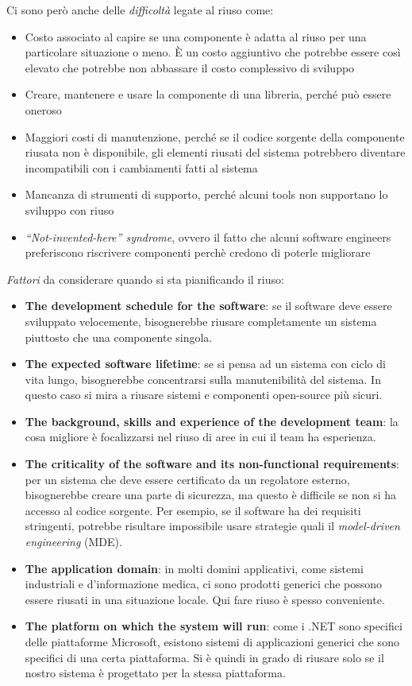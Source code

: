 			Ci sono però anche delle \textit{difficoltà} legate al riuso come:
			\begin{itemize}
				\item Costo associato al capire se una componente è adatta al riuso per una particolare situazione o meno. È un costo aggiuntivo che potrebbe essere così elevato che potrebbe non abbassare il costo complessivo di sviluppo
				\item Creare, mantenere e usare la componente di una libreria, perché può essere oneroso
				\item Maggiori costi di manutenzione, perché se il codice sorgente della componente riusata non è disponibile, gli elementi riusati del sistema potrebbero diventare incompatibili con i cambiamenti fatti al sistema
				\item Mancanza di strumenti di supporto, perché alcuni tools non supportano lo sviluppo con riuso
				\item \textit{``Not-invented-here'' syndrome}, ovvero il fatto che alcuni software engineers preferiscono riscrivere componenti perchè credono di poterle migliorare
			\end{itemize}
			\textit{Fattori} da considerare quando si sta pianificando il riuso:
			\begin{itemize}
				\item \textbf{The development schedule for the software}: se il software deve essere sviluppato velocemente, bisognerebbe riusare completamente un sistema piuttosto che una componente singola.
				\item \textbf{The expected software lifetime}: se si pensa ad un sistema con ciclo di vita lungo, bisognerebbe concentrarsi sulla manutenibilità del sistema. In questo caso si mira a riusare sistemi e componenti open-source più sicuri.
				\item \textbf{The background, skills and experience of the development team}: la cosa migliore è focalizzarsi nel riuso di aree in cui il team ha esperienza.
				\item \textbf{The criticality of the software and its non-functional requirements}: per un sistema che deve essere certificato da un regolatore esterno, bisognerebbe creare una parte di sicurezza, ma questo è difficile se non si ha accesso al codice sorgente. Per esempio, se il software ha dei requisiti stringenti, potrebbe risultare impossibile usare strategie quali il \textit{model-driven engineering} (MDE).
				\item \textbf{The application domain}: in molti domini applicativi, come sistemi industriali e d'informazione medica, ci sono prodotti generici che possono essere riusati in una situazione locale. Qui fare riuso è spesso conveniente.
				\item \textbf{The platform on which the system will run}: come i .NET sono specifici delle piattaforme Microsoft, esistono sistemi di applicazioni generici che sono specifici di una certa piattaforma. Si è quindi in grado di riusare solo se il nostro sistema è progettato per la stessa piattaforma.
			\end{itemize}

